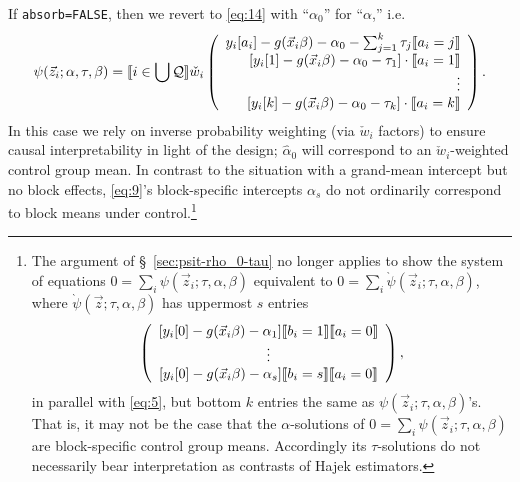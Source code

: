 \documentclass{article}
\DeclarePairedDelimiter{\indicator}{\llbracket}{\rrbracket}
\newcommand{\owt}[1][{[a_i]}]{\ensuremath{\check{w}_{i#1}}}
\begin{document}
If \texttt{absorb=FALSE}, then we revert to \eqref{eq:14} with ``$\alpha_0$'' for ``$\alpha$,'' i.e.
\begin{equation*}
         \psi(\vec{z}_{i};
  \alpha, \tau, \beta) = \indicator{i \in \bigcup \mathcal{Q}}\owt[]
         \left( \begin{array}{r}
           y_{i}[a_{i}] - g(\vec{x}_{i}\beta)-
                  \alpha_0 - \sum_{j=1}^{k}\tau_{j}\indicator{a_{i}=j}\\
           {}[y_{i}[1] - g(\vec{x}_{i}\beta)-
                  \alpha_0-\tau_{1}]\cdot \indicator{a_{i}=1}\\
                  \vdots \\
           {}[y_{i}[k] - g(\vec{x}_{i}\beta)-
                 \alpha_0 - \tau_{k}]\cdot \indicator{a_{i}=k}\\%
                \end{array}\right).
\end{equation*}
In this case we rely on inverse probability weighting (via $\owt[]$ factors) to ensure causal interpretability in light of the design;  $\hat{\alpha}_0$ will correspond to an $\owt[]$-weighted control group mean. In contrast to the situation with a grand-mean intercept but no block effects, \eqref{eq:9}'s block-specific intercepts $\alpha_s$ do not ordinarily correspond to block means under control.\footnote{%
The argument of \S~\ref{sec:psit-rho_0-tau} no longer applies
to show the system of equations
$0=\sum_{i}\psi(\vec{z}_{i}; \tau, \alpha, \beta)$
equivalent to $0=\sum_{i}\grave{\psi}(\vec{z}_{i}; \tau,
\alpha, \beta)$, where $\grave{\psi}(\vec{z}; \tau,
\alpha, \beta)$ has uppermost $s$ entries
\begin{equation*}
    \left(
    \begin{array}{c}
           [y_{i}[0] - g(\vec{x}_{i}\beta)-
                  \alpha_{1} ]\indicator{b_{i}=1} \indicator{a_{i}=0}\\
      \vdots\\ 
          {} [y_{i}[0] - g(\vec{x}_{i}\beta)-
                  \alpha_{s}]\indicator{b_{i}=s} \indicator{a_{i}=0}\\      
    \end{array}
    \right),
  \end{equation*}
in parallel with \eqref{eq:5}, but bottom $k$ entries the same as ${\psi}(\vec{z}_{i}; \tau,
\alpha, \beta)$'s. That is, it may not be the case that the $\alpha$-solutions of
$0=\sum_{i}\psi(\vec{z}_{i}; \tau, \alpha, \beta)$ are
block-specific control group means.  Accordingly its $\tau$-solutions
do not necessarily bear interpretation as contrasts of Hajek estimators.
}
\end{document}
